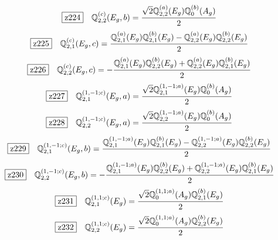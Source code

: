 \documentclass[fleqn,10pt,landscape]{jsarticle}
\begin{document}
\begin{dmath*}
\hspace*{3mm}\fbox{z224}\quad \mathbb{Q}_{2,2}^{(c)}(E_{g},b)=\frac{\sqrt{2} \mathbb{Q}_{2,2}^{(a)}(E_{g}) \mathbb{Q}_{0}^{(b)}(A_{g})}{2}
\end{dmath*}
\begin{dmath*}
\hspace*{3mm}\fbox{z225}\quad \mathbb{Q}_{2,1}^{(c)}(E_{g},c)=\frac{\mathbb{Q}_{2,1}^{(a)}(E_{g}) \mathbb{Q}_{2,1}^{(b)}(E_{g}) - \mathbb{Q}_{2,2}^{(a)}(E_{g}) \mathbb{Q}_{2,2}^{(b)}(E_{g})}{2}
\end{dmath*}
\begin{dmath*}
\hspace*{3mm}\fbox{z226}\quad \mathbb{Q}_{2,2}^{(c)}(E_{g},c)=- \frac{\mathbb{Q}_{2,1}^{(a)}(E_{g}) \mathbb{Q}_{2,2}^{(b)}(E_{g}) + \mathbb{Q}_{2,2}^{(a)}(E_{g}) \mathbb{Q}_{2,1}^{(b)}(E_{g})}{2}
\end{dmath*}
\begin{dmath*}
\hspace*{3mm}\fbox{z227}\quad \mathbb{Q}_{2,1}^{(1,-1;c)}(E_{g},a)=\frac{\sqrt{2} \mathbb{Q}_{2,1}^{(1,-1;a)}(E_{g}) \mathbb{Q}_{0}^{(b)}(A_{g})}{2}
\end{dmath*}
\begin{dmath*}
\hspace*{3mm}\fbox{z228}\quad \mathbb{Q}_{2,2}^{(1,-1;c)}(E_{g},a)=\frac{\sqrt{2} \mathbb{Q}_{2,2}^{(1,-1;a)}(E_{g}) \mathbb{Q}_{0}^{(b)}(A_{g})}{2}
\end{dmath*}
\begin{dmath*}
\hspace*{3mm}\fbox{z229}\quad \mathbb{Q}_{2,1}^{(1,-1;c)}(E_{g},b)=\frac{\mathbb{Q}_{2,1}^{(1,-1;a)}(E_{g}) \mathbb{Q}_{2,1}^{(b)}(E_{g}) - \mathbb{Q}_{2,2}^{(1,-1;a)}(E_{g}) \mathbb{Q}_{2,2}^{(b)}(E_{g})}{2}
\end{dmath*}
\begin{dmath*}
\hspace*{3mm}\fbox{z230}\quad \mathbb{Q}_{2,2}^{(1,-1;c)}(E_{g},b)=- \frac{\mathbb{Q}_{2,1}^{(1,-1;a)}(E_{g}) \mathbb{Q}_{2,2}^{(b)}(E_{g}) + \mathbb{Q}_{2,2}^{(1,-1;a)}(E_{g}) \mathbb{Q}_{2,1}^{(b)}(E_{g})}{2}
\end{dmath*}
\begin{dmath*}
\hspace*{3mm}\fbox{z231}\quad \mathbb{Q}_{2,1}^{(1,1;c)}(E_{g})=\frac{\sqrt{2} \mathbb{Q}_{0}^{(1,1;a)}(A_{g}) \mathbb{Q}_{2,1}^{(b)}(E_{g})}{2}
\end{dmath*}
\begin{dmath*}
\hspace*{3mm}\fbox{z232}\quad \mathbb{Q}_{2,2}^{(1,1;c)}(E_{g})=\frac{\sqrt{2} \mathbb{Q}_{0}^{(1,1;a)}(A_{g}) \mathbb{Q}_{2,2}^{(b)}(E_{g})}{2}
\end{dmath*}
\end{document}
